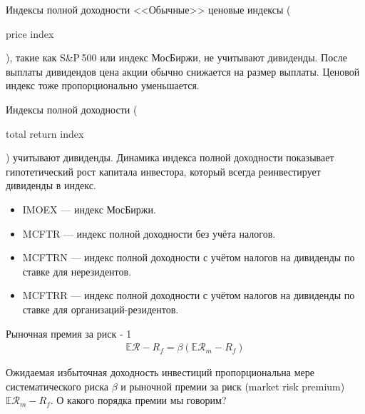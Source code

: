\documentclass{beamer}
\newcommand{\en}[1]{\begin{otherlanguage}{english}#1\end{otherlanguage}}
\begin{document}
\begin{frame}{Индексы полной доходности}
\justify
<<Обычные>> ценовые индексы (\en{price index}), такие как S\&P\,500 или индекс 
МосБиржи, не учитывают дивиденды. После выплаты дивидендов цена акции обычно 
снижается на размер выплаты. Ценовой индекс тоже пропорционально уменьшается.

\justify
Индексы полной доходности (\en{total return index}) учитывают дивиденды. 
Динамика индекса полной доходности показывает гипотетический рост капитала 
инвестора, который всегда реинвестирует дивиденды в индекс.

\justify
\begin{itemize}
\item IMOEX --- индекс МосБиржи.
\item MCFTR --- индекс полной доходности без учёта налогов.
\item MCFTRN --- индекс полной доходности с учётом налогов на дивиденды по 
ставке для нерезидентов.
\item MCFTRR --- индекс полной доходности с учётом налогов на дивиденды по
ставке для организаций-резидентов.
\end{itemize}
\end{frame}



\begin{frame}{Рыночная премия за риск - 1}
\begin{align*}
\mathbb{E}\mathcal{R} - R_f = \beta(\mathbb{E}\mathcal{R}_m - R_f)
\end{align*}

\justify
Ожидаемая избыточная доходность инвестиций пропорциональна мере 
систематического риска $\beta$ и рыночной премии за риск (market risk premium) 
$\mathbb{E}\mathcal{R}_m - R_f$. О какого порядка премии мы говорим?
\end{frame}



    \renewcommand{\addGrowthPlot}[4]{
        \addplot[
            color = #2,
            line width = 1pt, 
            mark = #3,
            mark repeat = 120,
            mark phase = 396,
            mark options = {scale=2},
            style = #4
        ]
        table[
            x = date,
            y = #1,
            col sep = comma
        ]
        {data/fama_french_cumulative_growth_data.csv};
    }
    
    \newcommand{\addFlatLine}[5] {
        \draw[
            red,
            thick
        ]
        (axis cs: #1, #3) -- (axis cs: #2, #3)
        node[
            pos=#5,
            anchor=south
        ]
        {\scriptsize #4};
    }
    
\end{document}
